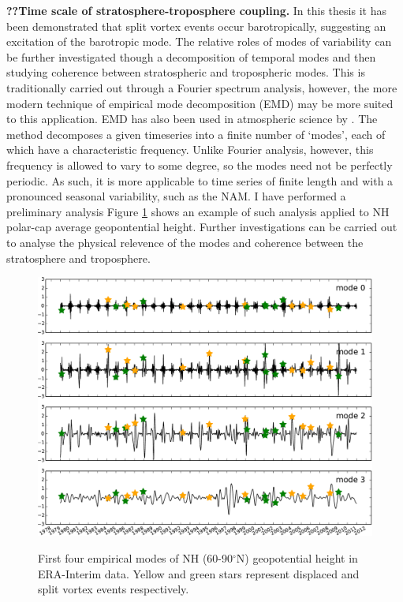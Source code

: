 \bigskip\noindent\textbf{??Time scale of stratosphere-troposphere coupling.} In
this thesis it has been demonstrated that split vortex events occur
barotropically, suggesting an excitation of the barotropic mode. The relative
roles of modes of variability can be further investigated though a decomposition
of temporal modes and then studying coherence between stratospheric and
tropospheric modes. This is traditionally carried out through a Fourier spectrum
analysis, however, the more modern technique of empirical mode decomposition
(EMD) \citep{Huang1998} may be more suited to this application. EMD has also
been used in atmospheric science by \citet{Coughlin2004}. The method decomposes
a given timeseries into a finite number of `modes', each of which have a
characteristic frequency. Unlike Fourier analysis, however, this frequency is
allowed to vary to some degree, so the modes need not be perfectly periodic. As
such, it is more applicable to time series of finite length and with a
pronounced seasonal variability, such as the NAM. I have performed a preliminary
analysis Figure \ref{fig:emd} shows an example of such analysis applied to NH
polar-cap average geopontential height. Further investigations can be carried
out to analyse the physical relevence of the modes and coherence between the
stratosphere and troposphere.

\begin{figure}[t]
  \centering
  \noindent\includegraphics[width=\textwidth,angle=0]{figures/chapter-conclusions/EMD.pdf}\\
  \caption[EMD timeseries]{First four empirical modes of NH (60-90$^{\circ}$N)
    geopotential height in ERA-Interim data. Yellow and green stars represent
    displaced and split vortex events respectively.}\label{fig:emd}
\end{figure}


